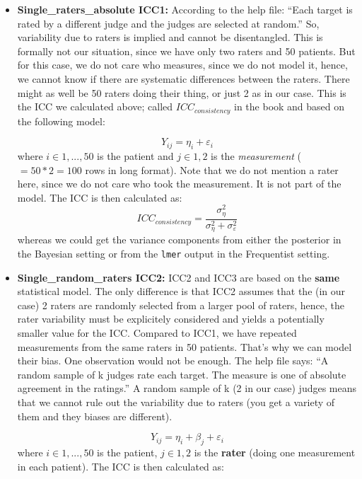 \documentclass[
]{book}
\begin{document}
\begin{itemize}
\item
  \textbf{Single\_raters\_absolute ICC1:}
  According to the help file: ``Each target is rated by a different
  judge and the judges are selected at random.'' So, variability due to raters
  is implied and cannot be disentangled.
  This is formally not our situation, since we have only two raters and
  50 patients. But for this case, we do not care who measures, since we do not
  model it, hence, we cannot know if there are systematic differences between
  the raters. There might as well be 50 raters doing their thing, or just 2 as in our case.
  This is the ICC we calculated above; called \(ICC_{consistency}\)
  in the book and based on the following model:

  \[ Y_{ij} = \eta_i + \varepsilon_i \]
  where \(i \in {1,...,50}\) is the patient and \(j \in {1,2}\) is the \emph{measurement}
  (\(=50*2=100\) rows in long format).
  Note that we do not mention a rater here, since we do not care who took the
  measurement. It is not part of the model. The ICC is then calculated as:
  \[ ICC_{consistency} = \frac{\sigma_{\eta}^2}{\sigma_{\eta}^2 + \sigma_{\varepsilon}^2}\]
  whereas we could get the variance components from either the posterior in the Bayesian
  setting or from the \texttt{lmer} output in the Frequentist setting.
\item
  \textbf{Single\_random\_raters ICC2:}
  ICC2 and ICC3 are based on the \textbf{same} statistical model. The only difference is
  that ICC2 assumes that the (in our case) 2 raters are randomly selected from a larger pool of raters,
  hence, the rater variability must be explicitely considered and yields a potentially smaller
  value for the ICC. Compared to ICC1, we have repeated measurements from the same raters
  in 50 patients. That's why we can model their bias. One observation would not be enough.
  The help file says: ``A random sample of k judges rate each target.
  The measure is one of absolute agreement in the ratings.''
  A random sample of k (2 in our case) judges means that we cannot rule out the variability
  due to raters (you get a variety of them and they biases are different).

  \[ Y_{ij} = \eta_i + \beta_j + \varepsilon_i \]
  where \(i \in {1,...,50}\) is the patient, \(j \in {1,2}\) is the \textbf{rater}
  (doing one measurement in each patient). The ICC is then calculated as:


\end{itemize}
\end{document}

